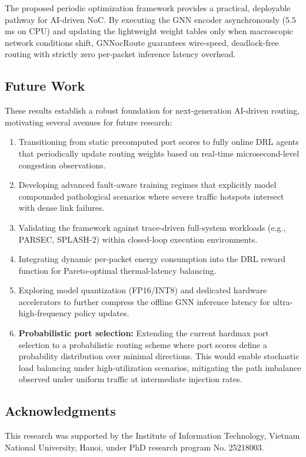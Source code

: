 The proposed periodic optimization framework provides a practical, deployable pathway for AI-driven NoC. By executing the GNN encoder asynchronously ($5.5$ ms on CPU) and updating the lightweight weight tables only when macroscopic network conditions shift, GNNocRoute guarantees wire-speed, deadlock-free routing with strictly zero per-packet inference latency overhead.

\subsection*{Future Work}

These results establish a robust foundation for next-generation AI-driven routing, motivating several avenues for future research:

\begin{enumerate}
    \item Transitioning from static precomputed port scores to fully online DRL agents that periodically update routing weights based on real-time microsecond-level congestion observations.
    \item Developing advanced fault-aware training regimes that explicitly model compounded pathological scenarios where severe traffic hotspots intersect with dense link failures.
    \item Validating the framework against trace-driven full-system workloads (e.g., PARSEC, SPLASH-2) within closed-loop execution environments.
    \item Integrating dynamic per-packet energy consumption into the DRL reward function for Pareto-optimal thermal-latency balancing.
    \item Exploring model quantization (FP16/INT8) and dedicated hardware accelerators to further compress the offline GNN inference latency for ultra-high-frequency policy updates.
    \item \textbf{Probabilistic port selection:} Extending the current hardmax port selection to a probabilistic routing scheme where port scores define a probability distribution over minimal directions. This would enable stochastic load balancing under high-utilization scenarios, mitigating the path imbalance observed under uniform traffic at intermediate injection rates.
\end{enumerate}

\subsection*{Acknowledgments}
This research was supported by the Institute of Information Technology, Vietnam National University, Hanoi, under PhD research program No. 25218003.
